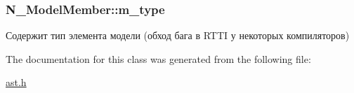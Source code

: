 \subsubsection[{m\+\_\+type}]{ N\+\_\+\+Model\+Member\+::m\+\_\+type\hspace{0.3cm}{\ttfamily [protected]}}\label{classN__ModelMember_a14c638e44cc0b3143dcb3bbf0f65dc6a}


Содержит тип элемента модели (обход бага в R\+T\+T\+I у некоторых компиляторов) 



The documentation for this class was generated from the following file\+:\begin{DoxyCompactItemize}
\item 
\hyperlink{ast_8h}{ast.\+h}\end{DoxyCompactItemize}

